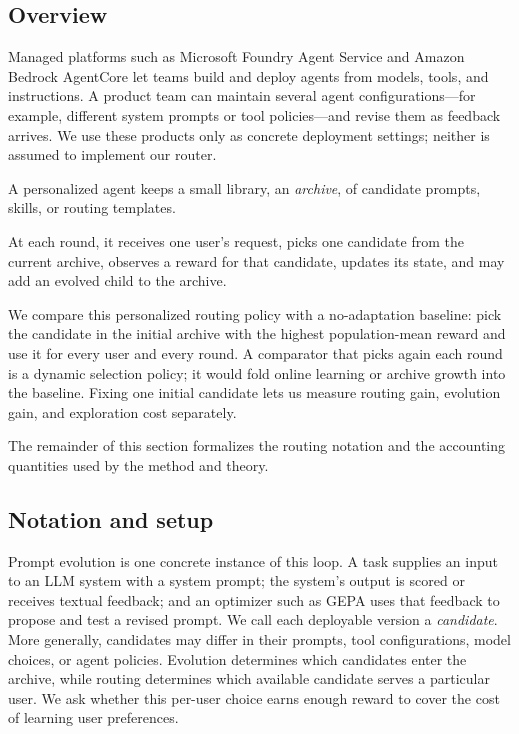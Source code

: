 \documentclass{article} %
\begin{document}
\subsection{Overview}

\label{sec:method-plain}
Managed platforms such as Microsoft Foundry Agent Service and Amazon Bedrock AgentCore \citep{microsoft2026foundryagents,aws2026agentcore} let teams build and deploy agents from models, tools, and instructions. A product team can maintain several agent configurations---for example, different system prompts or tool policies---and revise them as feedback arrives. We use these products only as concrete deployment settings; neither is assumed to implement our router.

A personalized agent keeps a small library, an \emph{archive}, of candidate prompts, skills, or routing templates.

At each round, it receives one user's request, picks one candidate from the current archive, observes a reward for that candidate, updates its state, and may add an evolved child to the archive.

We compare this personalized routing policy with a no-adaptation baseline: pick the candidate in the initial archive with the highest population-mean reward and use it for every user and every round. A comparator that picks again each round is a dynamic selection policy; it would fold online learning or archive growth into the baseline. Fixing one initial candidate lets us measure routing gain, evolution gain, and exploration cost separately.

The remainder of this section formalizes the routing notation and the accounting quantities used by the method and theory.

\subsection{Notation and setup}

\label{sec:method-notation}
Prompt evolution is one concrete instance of this loop. A task supplies an input to an LLM system with a system prompt; the system's output is scored or receives textual feedback; and an optimizer such as GEPA \citep{agrawal2025geparp} uses that feedback to propose and test a revised prompt. We call each deployable version a \emph{candidate}. More generally, candidates may differ in their prompts, tool configurations, model choices, or agent policies. Evolution determines which candidates enter the archive, while routing determines which available candidate serves a particular user. We ask whether this per-user choice earns enough reward to cover the cost of learning user preferences.
\end{document}
